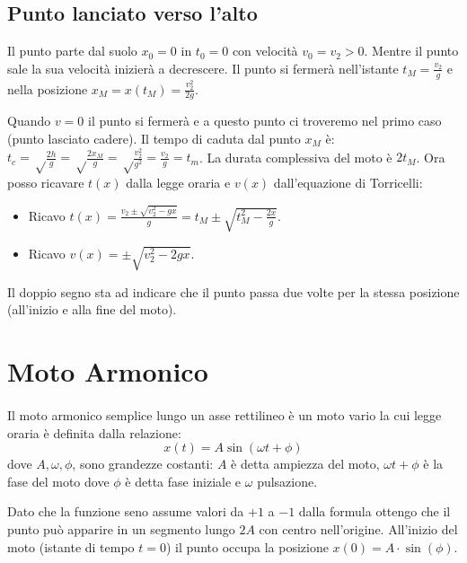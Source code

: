 \documentclass[class=book, crop=false, oneside, 12pt]{standalone}
\begin{document}
\subsection{Punto lanciato verso l'alto}

Il punto parte dal suolo \(x_0 = 0\) in \(t_0 = 0\) con velocità
\(v_ 0 =v_2 > 0\). Mentre il punto sale la sua velocità inizierà a
decrescere. Il punto si fermerà nell'istante \(t_M = \frac {v_2} g\) e
nella posizione \(x_M = x(t_M) = \frac {v_2^2} {2g}\).

Quando \(v = 0\) il punto si fermerà e a questo punto ci troveremo nel
primo caso (punto lasciato cadere). Il tempo di caduta dal punto \(x_M\)
è:
\(t_c = \sqrt \frac {2h}{g} = \sqrt \frac {2 x_M}{g} = \sqrt \frac {v_2^2}{g^2} = \frac {v_2} {g} = t_m\).
La durata complessiva del moto è \(2t_M\). Ora posso ricavare \(t(x)\)
dalla legge oraria e \(v(x)\) dall'equazione di Torricelli:

\begin{itemize}
\item
  Ricavo
  \(t(x) = \frac {v_2 \pm {\sqrt{v_2^2 -gx}}}{g} = t_M \pm \sqrt {t_M^2 - \frac {2x}{g}}\).
\item
  Ricavo \(v(x) = \pm \sqrt {v_2^2 -2gx}\).
\end{itemize}

Il doppio segno sta ad indicare che il punto passa due volte per la
stessa posizione (all'inizio e alla fine del moto).

\section{Moto Armonico}
\paragraph{}
Il moto armonico semplice lungo un asse rettilineo è un moto vario la cui legge oraria è definita dalla relazione:
\begin{equation}
  x(t) = A \sin (\omega t + \phi)
\end{equation}
dove \(A,\omega, \phi \), sono grandezze costanti: \(A\) è detta ampiezza del moto, \(\omega t + \phi \) è la fase del moto dove
\(\phi \) è detta fase iniziale e \(\omega \) pulsazione.

Dato che la funzione seno assume valori da \(+1\) a \(-1\) dalla formula ottengo che il punto può apparire in un segmento lungo \(2A\) con centro nell'origine.
All'inizio del moto (istante di tempo \(t = 0\)) il punto occupa la posizione \(x(0) = A \cdot \sin (\phi) \).
\end{document}
